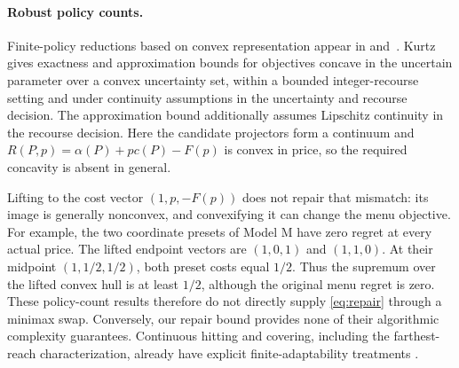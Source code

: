 \paragraph{Robust policy counts.}
Finite-policy reductions based on convex representation appear in
\cite[Theorem~1]{hanasusanto2015} and~\cite{buchheim2017}.
Kurtz~\cite[Theorems~2 and~7]{kurtz2026} gives exactness and approximation
bounds for objectives concave in the uncertain parameter over a convex
uncertainty set, within a bounded integer-recourse setting and under
continuity assumptions in the uncertainty and recourse decision. The
approximation bound additionally assumes Lipschitz continuity in the
recourse decision. Here the
candidate projectors form a continuum and
$R(P,p)=\alpha(P)+pc(P)-F(p)$ is convex in price, so the required
concavity is absent in general.

Lifting to the cost vector $(1,p,-F(p))$ does not repair that mismatch:
its image is generally nonconvex, and convexifying it can change the menu
objective. For example, the two coordinate presets of Model M have zero
regret at every actual price. The lifted endpoint vectors are $(1,0,1)$
and $(1,1,0)$. At their midpoint $(1,1/2,1/2)$, both preset costs equal
$1/2$. Thus the supremum over the lifted convex hull is at least $1/2$,
although the original menu regret is zero. These policy-count results
therefore do not directly supply \eqref{eq:repair} through a minimax swap.
Conversely, our repair bound provides none of their algorithmic complexity
guarantees. Continuous hitting and covering, including the farthest-reach
characterization, already have explicit finite-adaptability treatments
\cite{cardinal2025}.
